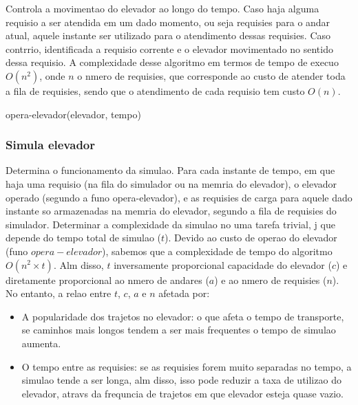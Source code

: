 \documentclass[12pt]{article}
\begin{document}
Controla a movimentao do elevador ao longo do tempo. Caso haja alguma requisio a ser atendida em um dado momento, ou seja requisies para o andar atual, aquele instante ser utilizado para o atendimento dessas requisies. Caso contrrio,  identificada a requisio corrente e o elevador  movimentado no sentido dessa requisio. A complexidade desse algoritmo em termos de tempo de execuo  $O(n^2)$, onde $n$  o nmero de requisies, que corresponde ao custo de atender toda a fila de requisies, sendo que o atendimento de cada requisio tem custo $O(n)$.
\begin{algorithm}[h!]
\begin{footnotesize}


\caption{opera-elevador(elevador, tempo)}%
\end{footnotesize}
\end{algorithm}


\subsubsection{Simula elevador}

Determina o funcionamento da simulao. Para cada instante de tempo, em que haja uma requisio (na fila do simulador ou na memria do elevador), o elevador  operado (segundo a funo opera-elevador), e as requisies de carga para aquele dado instante so armazenadas na memria do elevador, segundo a fila de requisies do simulador. Determinar a complexidade da simulao no  uma tarefa trivial, j que depende do tempo total de simulao ($t$). Devido ao custo de operao do elevador (funo $opera-elevador$), sabemos que a complexidade de tempo do algoritmo  $O(n^2\times t)$. Alm disso, $t$  inversamente proporcional  capacidade do elevador ($c$) e diretamente proporcional ao nmero de andares ($a$) e ao nmero de requisies ($n$). No entanto, a relao entre $t$, $c$, $a$ e $n$  afetada por:
\begin{itemize}
\item A popularidade dos trajetos no elevador: o que afeta o tempo de transporte, se caminhos mais longos tendem a ser mais frequentes o tempo de simulao aumenta.
\item O tempo entre as requisies: se as requisies forem muito separadas no tempo, a simulao tende a ser longa, alm disso, isso pode reduzir a taxa de utilizao do elevador, atravs da frequncia de trajetos em que elevador esteja quase vazio.
\end{itemize}
\end{document}
